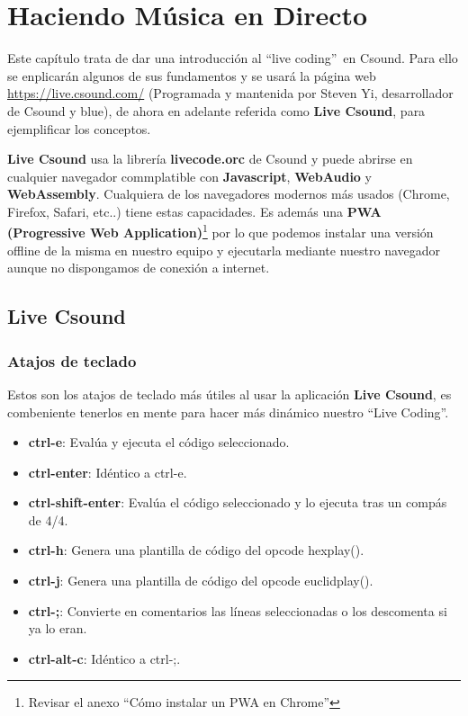 
\chapter{Haciendo Música en Directo}

Este capítulo trata de dar una introducción al ``live coding''\ en Csound. Para ello se enplicarán algunos de sus fundamentos y se usará la página web \url{https://live.csound.com/} (Programada y mantenida por Steven Yi, desarrollador de Csound y blue), de ahora en adelante referida como \textbf{Live Csound}, para ejemplificar los conceptos.

\textbf{Live Csound} usa la librería \textbf{livecode.orc} de Csound y puede abrirse en cualquier navegador commplatible con \textbf{Javascript}, \textbf{WebAudio} y \textbf{WebAssembly}. Cualquiera de los navegadores modernos más usados (Chrome, Firefox, Safari, etc..) tiene estas capacidades. Es además una \textbf{PWA (Progressive Web Application)}\footnote{Revisar el anexo ``Cómo instalar un PWA en Chrome''} por lo que podemos instalar una versión offline de la misma en nuestro equipo y ejecutarla mediante nuestro navegador aunque no dispongamos de conexión a internet.

\section{Live Csound}

\subsection{Atajos de teclado}

Estos son los atajos de teclado más útiles al usar la aplicación \textbf{Live Csound}, es combeniente tenerlos en mente para hacer más dinámico nuestro ``Live Coding''.

\begin{itemize}
 \item \textbf{ctrl-e}: Evalúa y ejecuta el código seleccionado.
 \item \textbf{ctrl-enter}:	Idéntico a ctrl-e.
 \item \textbf{ctrl-shift-enter}:  Evalúa el código seleccionado y lo ejecuta tras un compás de 4/4.
 \item \textbf{ctrl-h}:	Genera una plantilla de código del opcode hexplay().
 \item \textbf{ctrl-j}:	Genera una plantilla de código del opcode euclidplay().
 \item \textbf{ctrl-;}:	Convierte en comentarios las líneas seleccionadas o los descomenta si ya lo eran.
 \item \textbf{ctrl-alt-c}:	Idéntico a ctrl-;.
\end{itemize}

